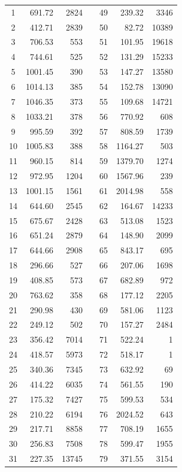 \documentclass[
  digital,     %
  oneside,     %
  nosansbold,  %
  nocolorbold, %
  nolof,         %
  nolot,         %
]{fithesis4}
\begin{document}
\begin{longtable}[c]{c|r|rcc|r|r}
 1 & 691.72 & 2824 &  & 49 & 239.32 & 3346\\
2 & 412.71 & 2839 &  & 50 & 82.72 & 10389\\
3 & 706.53 & 553 &  & 51 & 101.95 & 19618\\
4 & 744.61 & 525 &  & 52 & 131.29 & 15233\\
5 & 1001.45 & 390 &  & 53 & 147.27 & 13580\\
6 & 1014.13 & 385 &  & 54 & 152.78 & 13090\\
7 & 1046.35 & 373 &  & 55 & 109.68 & 14721\\
8 & 1033.21 & 378 &  & 56 & 770.92 & 608\\
9 & 995.59 & 392 &  & 57 & 808.59 & 1739\\
10 & 1005.83 & 388 &  & 58 & 1164.27 & 503\\
11 & 960.15 & 814 &  & 59 & 1379.70 & 1274\\
12 & 972.95 & 1204 &  & 60 & 1567.96 & 239\\
13 & 1001.15 & 1561 &  & 61 & 2014.98 & 558\\
14 & 644.60 & 2545 &  & 62 & 164.67 & 14233\\
15 & 675.67 & 2428 &  & 63 & 513.08 & 1523\\
16 & 651.24 & 2879 &  & 64 & 148.90 & 2099\\
17 & 644.66 & 2908 &  & 65 & 843.17 & 695\\
18 & 296.66 & 527 &  & 66 & 207.06 & 1698\\
19 & 408.85 & 573 &  & 67 & 682.89 & 972\\
20 & 763.62 & 358 &  & 68 & 177.12 & 2205\\
21 & 290.98 & 430 &  & 69 & 581.06 & 1123\\
22 & 249.12 & 502 &  & 70 & 157.27 & 2484\\
23 & 356.42 & 7014 &  & 71 & 522.24 & 1\\
24 & 418.57 & 5973 &  & 72 & 518.17 & 1\\
25 & 340.36 & 7345 &  & 73 & 632.92 & 69\\
26 & 414.22 & 6035 &  & 74 & 561.55 & 190\\
27 & 175.32 & 7427 &  & 75 & 599.53 & 534\\
28 & 210.22 & 6194 &  & 76 & 2024.52 & 643\\
29 & 217.71 & 8858 &  & 77 & 708.19 & 1655\\
30 & 256.83 & 7508 &  & 78 & 599.47 & 1955\\
31 & 227.35 & 13745 &  & 79 & 371.55 & 3154\\

\end{longtable}
\end{document}
